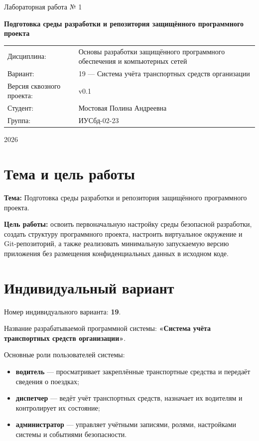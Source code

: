 \documentclass[12pt,a4paper]{article}
\begin{document}
\begin{titlepage}
\centering
{\large Лабораторная работа № 1\par}
\vspace{2.5cm}
{\LARGE\bfseries Подготовка среды разработки и репозитория защищённого программного проекта\par}
\vspace{1.8cm}
\begin{tabular}{p{4cm}p{11cm}}
Дисциплина: & Основы разработки защищённого программного обеспечения и компьютерных сетей\\
Вариант: & 19 — Система учёта транспортных средств организации\\
Версия сквозного проекта: & v0.1\\
Студент: & Мостовая Полина Андреевна\\
Группа: & ИУСбд-02-23
\end{tabular}
\vfill
{\large 2026\par}
\end{titlepage}
\tableofcontents
\clearpage
\section{Тема и цель работы}

\textbf{Тема:} Подготовка среды разработки и репозитория защищённого программного проекта.

\textbf{Цель работы:} освоить первоначальную настройку среды безопасной разработки, создать структуру программного проекта, настроить виртуальное окружение и Git-репозиторий, а также реализовать минимальную запускаемую версию приложения без размещения конфиденциальных данных в исходном коде.

\section{Индивидуальный вариант}

Номер индивидуального варианта: \textbf{19}.

Название разрабатываемой программной системы: \textbf{«Система учёта транспортных средств организации»}.

Основные роли пользователей системы:

\begin{itemize}
\item \textbf{водитель} — просматривает закреплённые транспортные средства и передаёт сведения о поездках;
\item \textbf{диспетчер} — ведёт учёт транспортных средств, назначает их водителям и контролирует их состояние;
\item \textbf{администратор} — управляет учётными записями, ролями, настройками системы и событиями безопасности.
\end{itemize}
\end{document}
